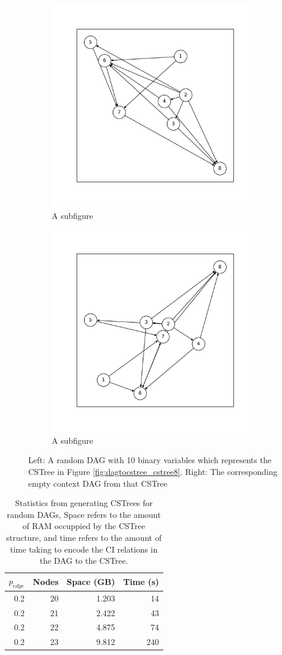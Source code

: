 \documentclass{tufte-book}
\begin{document}
\begin{figure}
\centering
\begin{subfigure}{\textwidth}
  \centering
  \includegraphics[width=.45\linewidth]{figures/dagtocstree_dag8.pdf}
  \caption{A subfigure}
  \label{fig:sub1}
\end{subfigure}%
\begin{subfigure}{\textwidth}
  \centering
  \includegraphics[width=.45\linewidth]{figures/dagtocstree_mcdag8.pdf}
  \caption{A subfigure}
  \label{fig:sub2}
\end{subfigure}
\caption{Left: A random DAG with 10 binary variables which represents the CSTree in Figure \ref{fig:dagtocstree_cstree8}. Right: The corresponding empty context DAG from that CSTree}
\label{fig:dagtocstree_dag8}
\end{figure}



\begin{table}[htbp]
\caption{Statistics from generating CSTrees for random DAGs, Space refers to the amount of RAM occuppied by the CSTree structure, and time refers to the amount of time taking to encode the CI relations in the DAG to the CSTree.}
\centering
\begin{tabular}{r|r|r|r}
\hline
\(p_{edge}\) & Nodes & Space  (GB) & Time (s)\\
\hline
0.2 & 20 & 1.203 & 14\\
\hline
0.2 & 21 & 2.422 & 43\\
\hline
0.2 & 22 & 4.875 & 74\\
\hline
0.2 & 23 & 9.812 & 240\\
\hline
\end{tabular}
\end{table}
\end{document}

